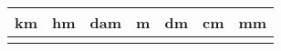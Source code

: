 \begin{tabular}{|c|c|c|c|c|c|c|}	
	\hline
		\rowcolor{gray} \textbf{km} & \textbf{hm} & \textbf{dam} & \textbf{m} & \textbf{dm} & \textbf{cm} & \textbf{mm} \\
	\hline
		 & & & & & & \\
	\hline	
\end{tabular}